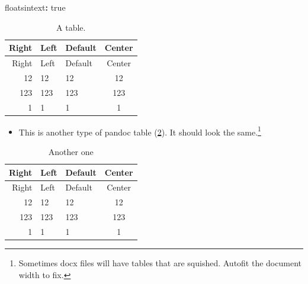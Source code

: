 \documentclass[man,longtable,noextraspace,floatsintext]{apa6}
\let\tightlist\relax %
\newenvironment{Shaded}{}{}
\newcommand{\AttributeTok}[1]{\textcolor[rgb]{0.49,0.56,0.16}{#1}}
\newcommand{\CharTok}[1]{\textcolor[rgb]{0.25,0.44,0.63}{#1}}
\newcommand{\FunctionTok}[1]{\textcolor[rgb]{0.02,0.16,0.49}{#1}}
\newcommand{\KeywordTok}[1]{\textcolor[rgb]{0.00,0.44,0.13}{\textbf{#1}}}
\begin{document}
\begin{Shaded}
\begin{Highlighting}[]
\FunctionTok{floatsintext}\KeywordTok{:}\AttributeTok{ }\CharTok{true}
\end{Highlighting}
\end{Shaded}

\begin{longtable}[]{@{}rllc@{}}
\caption{A table. \label{tbl:mytable}}\tabularnewline
\toprule
Right & Left & Default & Center\tabularnewline
\midrule
\endfirsthead
\toprule
Right & Left & Default & Center\tabularnewline
\midrule
\endhead
12 & 12 & 12 & 12\tabularnewline
123 & 123 & 123 & 123\tabularnewline
1 & 1 & 1 & 1\tabularnewline
\bottomrule
\end{longtable}

\begin{itemize}
\tightlist
\item
  This is another type of pandoc table (\ref{tbl:anotherone}). It should
  look the same.\footnote{Sometimes docx files will have tables that are
    squished. Autofit the document width to fix.}
\end{itemize}

\begin{longtable}[]{@{}rllc@{}}
\caption{Another one \label{tbl:anotherone}}\tabularnewline
\toprule
Right & Left & Default & Center\tabularnewline
\midrule
\endfirsthead
\toprule
Right & Left & Default & Center\tabularnewline
\midrule
\endhead
12 & 12 & 12 & 12\tabularnewline
123 & 123 & 123 & 123\tabularnewline
1 & 1 & 1 & 1\tabularnewline
\bottomrule
\end{longtable}

\newpage
\end{document}
